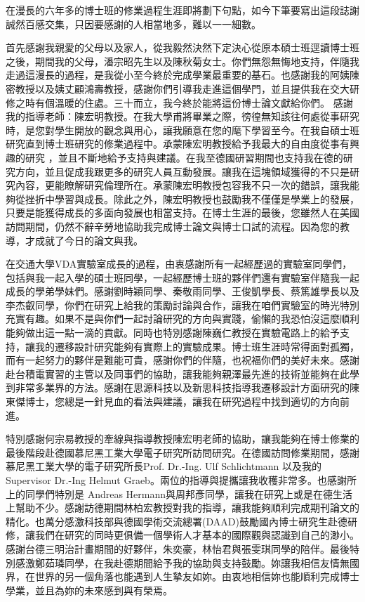 
在漫長的六年多的博士班的修業過程生涯即將劃下句點，如今下筆要寫出這段誌謝誠然百感交集，只因要感謝的人相當地多，難以一一細數。

首先感謝我親愛的父母以及家人，從我毅然決然下定決心從原本碩士班逕讀博士班之後，期間我的父母，潘宗昭先生以及陳秋菊女士。你們無怨無悔地支持，伴隨我走過這漫長的過程，是我從小至今終於完成學業最重要的基石。也感謝我的阿姨陳密教授以及姨丈顧鴻壽教授，感謝你們引導我走進這個學門，並且提供我在交大研修之時有個溫暖的住處。三十而立，我今終於能將這份博士論文獻給你們。
感謝我的指導老師：陳宏明教授。在我大學甫將畢業之際，徬徨無知該往何處從事研究時，是您對學生開放的觀念與用心，讓我願意在您的麾下學習至今。在我自碩士班研究直到博士班研究的修業過程中。承蒙陳宏明教授給予我最大的自由度從事有興趣的研究
，並且不斷地給予支持與建議。在我至德國研習期間也支持我在德的研究方向，並且促成我跟更多的研究人員互動發展。讓我在這塊領域獲得的不只是研究內容，更能瞭解研究倫理所在。承蒙陳宏明教授包容我不只一次的錯誤，讓我能夠從挫折中學習與成長。除此之外，陳宏明教授也鼓勵我不僅僅是學業上的發展，只要是能獲得成長的多面向發展也相當支持。在博士生涯的最後，您雖然人在美國訪問期間，仍然不辭辛勞地協助我完成博士論文與博士口試的流程。因為您的教導，才成就了今日的論文與我。

在交通大學VDA實驗室成長的過程，由衷感謝所有一起經歷過的實驗室同學們，包括與我一起入學的碩士班同學，一起經歷博士班的夥伴們還有實驗室伴隨我一起成長的學弟學妹們。感謝劉時穎同學、秦敬雨同學、王俊凱學長、蔡篤雄學長以及李杰叡同學，你們在研究上給我的策勵討論與合作，讓我在咱們實驗室的時光特別充實有趣。如果不是與你們一起討論研究的方向與實踐，偷懶的我恐怕沒這麼順利能夠做出這一點一滴的貢獻。同時也特別感謝陳巍仁教授在實驗電路上的給予支持，讓我的遷移設計研究能夠有實際上的實驗成果。博士班生涯時常得面對孤獨，而有一起努力的夥伴是難能可貴，感謝你們的伴隨，也祝福你們的美好未來。感謝赴台積電實習的主管以及同事們的協助，讓我能夠親澤最先進的技術並能夠在此學到非常多業界的方法。感謝在思源科技以及新思科技指導我遷移設計方面研究的陳東傑博士，您總是一針見血的看法與建議，讓我在研究過程中找到適切的方向前進。

特別感謝何宗易教授的牽線與指導教授陳宏明老師的協助，讓我能夠在博士修業的最後階段赴德國慕尼黑工業大學電子研究所訪問研究。在德國訪問修業期間，感謝慕尼黑工業大學的電子研究所長Prof. Dr.-Ing. Ulf Schlichtmann 以及我的Supervisor Dr.-Ing Helmut Graeb。兩位的指導與提攜讓我收穫非常多。也感謝所上的同學們特別是 Andreas Hermann與周邦彥同學，讓我在研究上或是在德生活上幫助不少。感謝訪德期間林柏宏教授對我的指導，讓我能夠順利完成期刊論文的精化。也萬分感激科技部與德國學術交流總署(DAAD)鼓勵國內博士研究生赴德研修，讓我們在研究的同時更俱備一個學術人才基本的國際觀與認識到自己的渺小。感謝台德三明治計畫期間的好夥伴，朱奕豪，林怡君與張雯琪同學的陪伴。最後特別感激鄭茹璘同學，在我赴德期間給予我的協助與支持鼓勵。妳讓我相信友情無國界，在世界的另一個角落也能遇到人生摯友如妳。由衷地相信妳也能順利完成博士學業，並且為妳的未來感到與有榮焉。

